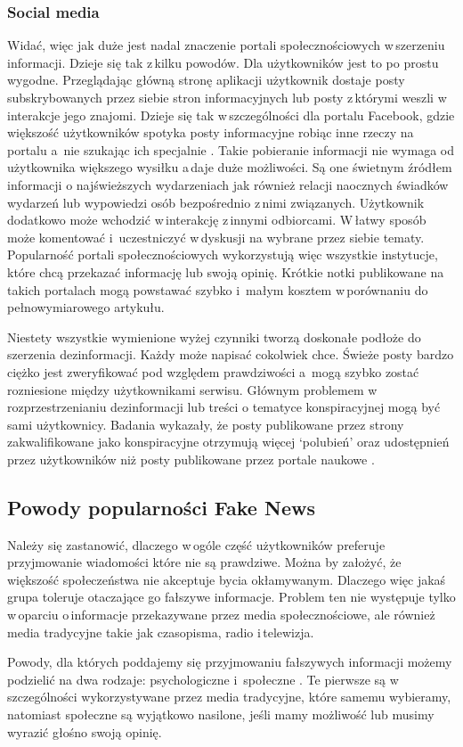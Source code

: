 \subsubsection{Social media}
Widać, więc jak duże jest nadal znaczenie portali społecznościowych w\,szerzeniu informacji. Dzieje się tak z\,kilku powodów. Dla użytkowników jest to po prostu wygodne. Przeglądając główną stronę aplikacji użytkownik dostaje posty subskrybowanych przez siebie stron informacyjnych lub posty z\,którymi weszli w\,interakcje jego znajomi. Dzieje się tak w\,szczególności dla portalu Facebook, gdzie większość użytkowników spotyka posty informacyjne robiąc inne rzeczy na portalu a \,nie szukając ich specjalnie \cite{PewNewsUse2016}. Takie pobieranie informacji nie wymaga od użytkownika większego wysiłku a\,daje duże możliwości. Są one świetnym źródłem informacji o najświeższych wydarzeniach jak również relacji naocznych świadków wydarzeń lub wypowiedzi osób bezpośrednio z\,nimi związanych. Użytkownik dodatkowo może wchodzić w\,interakcję z\,innymi odbiorcami. W\,łatwy sposób może komentować i \,uczestniczyć w\,dyskusji na wybrane przez siebie tematy. Popularność portali społecznościowych wykorzystują więc wszystkie instytucje, które chcą przekazać informację lub swoją opinię. Krótkie notki publikowane na takich portalach mogą powstawać szybko i \,małym kosztem w\,porównaniu do pełnowymiarowego artykułu. 
\par Niestety wszystkie wymienione wyżej czynniki tworzą doskonałe podłoże do szerzenia dezinformacji. Każdy może napisać cokolwiek chce. Świeże posty bardzo ciężko jest zweryfikować pod względem prawdziwości a \,mogą szybko zostać rozniesione między użytkownikami serwisu. Głównym problemem w\,rozprzestrzenianiu dezinformacji lub treści o tematyce konspiracyjnej mogą być sami użytkownicy. Badania wykazały, że posty publikowane przez strony zakwalifikowane jako konspiracyjne otrzymują więcej ‘polubień’ oraz udostępnień przez użytkowników niż posty publikowane przez portale naukowe \cite{bessi2015science}. 

\subsection{Powody popularności Fake News}
Należy się zastanowić, dlaczego w\,ogóle część użytkowników preferuje przyjmowanie wiadomości które nie są prawdziwe. Można by założyć, że większość społeczeństwa nie akceptuje bycia okłamywanym. Dlaczego więc jakaś grupa toleruje otaczające go fałszywe informacje.  Problem ten nie występuje tylko w\,oparciu o\,informacje przekazywane przez media społecznościowe, ale również media tradycyjne takie jak czasopisma, radio i\,telewizja. 
\par Powody, dla których poddajemy się przyjmowaniu fałszywych informacji możemy podzielić na dwa rodzaje: psychologiczne i \,społeczne \cite{shu2017fake}. Te pierwsze są w\,szczególności wykorzystywane przez media tradycyjne, które samemu wybieramy, natomiast społeczne są wyjątkowo nasilone, jeśli mamy możliwość lub musimy wyrazić głośno swoją opinię.

